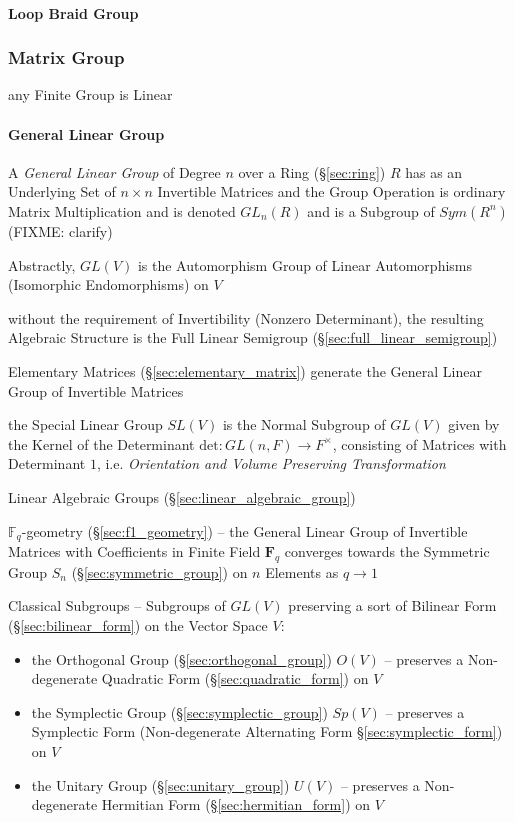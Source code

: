 \paragraph{Loop Braid Group}\label{sec:loop_braid_group}\hfill



\subsubsection{Matrix Group}\label{sec:matrix_group}

any Finite Group is Linear



\paragraph{General Linear Group}\label{sec:general_linear_group}\hfill

A \emph{General Linear Group} of Degree $n$ over a Ring (\S\ref{sec:ring}) $R$
has as an Underlying Set of $n \times n$ Invertible Matrices and the Group
Operation is ordinary Matrix Multiplication and is denoted $GL_n(R)$ and is a
Subgroup of $Sym(R^n)$ (FIXME: clarify)

Abstractly, $GL(V)$ is the Automorphism Group of Linear Automorphisms
(Isomorphic Endomorphisms) on $V$

without the requirement of Invertibility (Nonzero Determinant), the resulting
Algebraic Structure is the Full Linear Semigroup
(\S\ref{sec:full_linear_semigroup})

Elementary Matrices (\S\ref{sec:elementary_matrix}) generate the General Linear
Group of Invertible Matrices

the Special Linear Group $SL(V)$ is the Normal Subgroup of $GL(V)$ given by the
Kernel of the Determinant $\mathrm{det} : GL(n,F) \rightarrow F^\times$,
consisting of Matrices with Determinant $1$, i.e. \emph{Orientation and Volume
  Preserving Transformation}

\fist Linear Algebraic Groups (\S\ref{sec:linear_algebraic_group})

\fist $\mathbb{F}_q$-geometry (\S\ref{sec:f1_geometry}) -- the General Linear
Group of Invertible Matrices with Coefficients in Finite Field $\mathbf{F}_q$
converges towards the Symmetric Group $S_n$ (\S\ref{sec:symmetric_group}) on $n$
Elements as $q \rightarrow 1$

Classical Subgroups -- Subgroups of $GL(V)$ preserving a sort of Bilinear Form
(\S\ref{sec:bilinear_form}) on the Vector Space $V$:
\begin{itemize}
  \item the Orthogonal Group (\S\ref{sec:orthogonal_group}) $O(V)$ -- preserves
    a Non-degenerate Quadratic Form (\S\ref{sec:quadratic_form}) on $V$
  \item the Symplectic Group (\S\ref{sec:symplectic_group}) $Sp(V)$
    -- preserves a Symplectic Form (Non-degenerate Alternating Form
    \S\ref{sec:symplectic_form}) on $V$
  \item the Unitary Group (\S\ref{sec:unitary_group}) $U(V)$
    -- preserves a Non-degenerate Hermitian Form (\S\ref{sec:hermitian_form})
    on $V$
\end{itemize}

